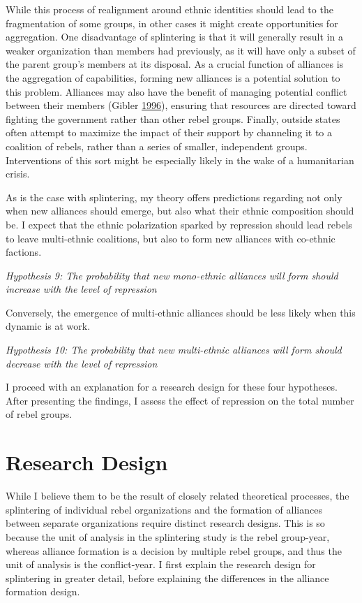 \documentclass[12pt,]{book}
\theoremstyle{definition}
\theoremstyle{definition}
\theoremstyle{definition}
\theoremstyle{remark}
\begin{document}
While this process of realignment around ethnic identities should lead
to the fragmentation of some groups, in other cases it might create
opportunities for aggregation. One disadvantage of splintering is that
it will generally result in a weaker organization than members had
previously, as it will have only a subset of the parent group's members
at its disposal. As a crucial function of alliances is the aggregation
of capabilities, forming new alliances is a potential solution to this
problem. Alliances may also have the benefit of managing potential
conflict between their members (Gibler
\protect\hyperlink{ref-Gibler1996}{1996}), ensuring that resources are
directed toward fighting the government rather than other rebel groups.
Finally, outside states often attempt to maximize the impact of their
support by channeling it to a coalition of rebels, rather than a series
of smaller, independent groups. Interventions of this sort might be
especially likely in the wake of a humanitarian crisis.

As is the case with splintering, my theory offers predictions regarding
not only when new alliances should emerge, but also what their ethnic
composition should be. I expect that the ethnic polarization sparked by
repression should lead rebels to leave multi-ethnic coalitions, but also
to form new alliances with co-ethnic factions.

\emph{Hypothesis 9: The probability that new mono-ethnic alliances will
form should increase with the level of repression}

Conversely, the emergence of multi-ethnic alliances should be less
likely when this dynamic is at work.

\emph{Hypothesis 10: The probability that new multi-ethnic alliances
will form should decrease with the level of repression}

I proceed with an explanation for a research design for these four
hypotheses. After presenting the findings, I assess the effect of
repression on the total number of rebel groups.

\hypertarget{research-design-2}{%
\section{Research Design}\label{research-design-2}}

While I believe them to be the result of closely related theoretical
processes, the splintering of individual rebel organizations and the
formation of alliances between separate organizations require distinct
research designs. This is so because the unit of analysis in the
splintering study is the rebel group-year, whereas alliance formation is
a decision by multiple rebel groups, and thus the unit of analysis is
the conflict-year. I first explain the research design for splintering
in greater detail, before explaining the differences in the alliance
formation design.
\end{document}
